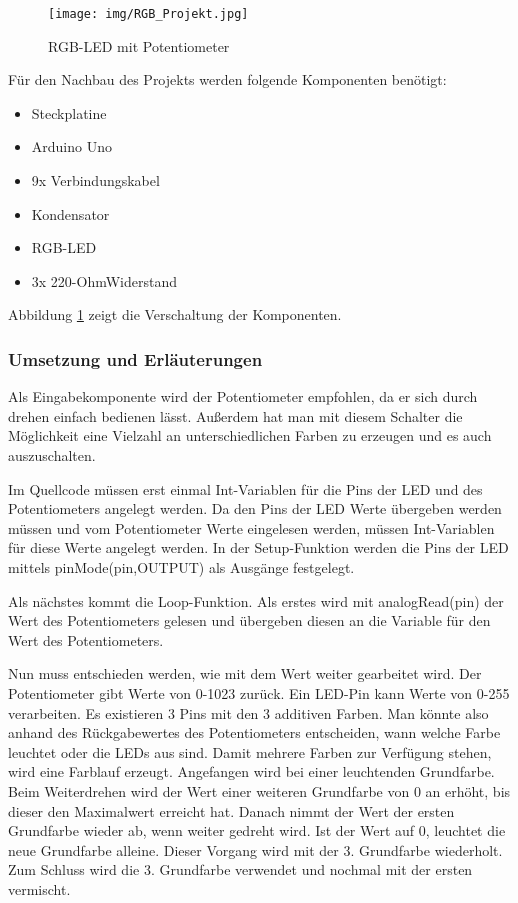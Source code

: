 \begin{figure}[h]
\begin{center}
\texttt{[image: img/RGB\_Projekt.jpg]}
\caption{RGB-LED mit Potentiometer}
\label{rgb_project}
\end{center}
\end{figure}

Für den Nachbau des Projekts werden folgende Komponenten benötigt:
\begin{itemize}
\item{Steckplatine}
\item{Arduino Uno}
\item{9x Verbindungskabel}
\item{Kondensator}
\item{RGB-LED}
\item{3x 220-OhmWiderstand}
\end{itemize}

Abbildung \ref{rgb_project} zeigt die Verschaltung der Komponenten.
 
\subsubsection{Umsetzung und Erläuterungen}
Als Eingabekomponente wird der Potentiometer empfohlen, da er sich durch drehen einfach bedienen lässt. Außerdem hat man mit diesem Schalter die Möglichkeit eine Vielzahl an unterschiedlichen Farben zu erzeugen und es auch auszuschalten.
 
Im Quellcode müssen erst einmal Int-Variablen für die Pins der LED und des Potentiometers angelegt werden. Da den Pins der LED Werte übergeben werden müssen und vom Potentiometer Werte eingelesen werden, müssen Int-Variablen für diese Werte angelegt werden.
In der Setup-Funktion werden die Pins der LED mittels pinMode(pin,OUTPUT) als Ausgänge festgelegt.

Als nächstes kommt die Loop-Funktion. Als erstes wird mit analogRead(pin) der Wert des Potentiometers gelesen und übergeben diesen an die Variable für den Wert des Potentiometers.

Nun muss entschieden werden, wie mit dem Wert weiter gearbeitet wird. Der Potentiometer gibt Werte von 0-1023 zurück. Ein LED-Pin kann Werte von 0-255 verarbeiten. Es existieren 3 Pins mit den 3 additiven Farben. Man könnte also anhand des Rückgabewertes des Potentiometers entscheiden, wann welche Farbe leuchtet oder die LEDs aus sind. Damit mehrere Farben zur Verfügung stehen, wird eine Farblauf erzeugt. Angefangen wird bei einer leuchtenden Grundfarbe. Beim Weiterdrehen wird der Wert einer weiteren Grundfarbe von 0 an erhöht, bis dieser den Maximalwert erreicht hat. Danach nimmt der Wert der ersten Grundfarbe wieder ab, wenn weiter gedreht wird. Ist der Wert auf 0, leuchtet die neue Grundfarbe alleine. Dieser Vorgang wird mit der 3. Grundfarbe wiederholt. Zum Schluss wird die 3. Grundfarbe verwendet und nochmal mit der ersten vermischt.

